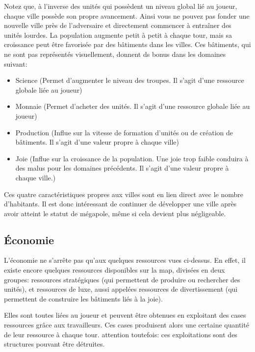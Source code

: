 \documentclass[12pt]{report}
\begin{document}
Notez que, à l’inverse des unités qui possèdent un niveau global lié au joueur,
chaque ville possède son propre avancement. Ainsi vous ne pouvez pas fonder une
nouvelle ville près de l’adversaire et directement commencer à entraîner des
unités lourdes. La population augmente petit à petit à chaque tour, mais sa
croissance peut être favorisée par des bâtiments dans les villes. Ces bâtiments,
qui ne sont pas représentés visuellement, donnent ds bonus dans les domaines
suivant:

\begin{itemize}
    \item Science (Permet d’augmenter le niveau des troupes. Il s’agit d’une
        ressource globale liée au joueur)
    \item Monnaie (Permet d’acheter des unités. Il s’agit d’une ressource
        globale liée au joueur)
    \item Production (Influe sur la vitesse de formation d’unités ou de création
        de bâtiments. Il s’agit d’une valeur propre à chaque ville)
    \item Joie (Influe sur la croissance de la population. Une joie trop faible
        conduira à des malus pour les domaines précédents. Il s’agit d’une
        valeur propre à chaque ville.)
\end{itemize}

Ces quatre caractéristiques propres aux villes sont en lien direct avec le
nombre d’habitants. Il est donc intéressant de continuer de développer une ville
après avoir atteint le statut de mégapole, même si cela devient plus
négligeable.

\subsection{Économie}

L’économie ne s’arrête pas qu’aux quelques ressources vues ci-dessus. En effet,
il existe encore quelques ressources disponibles sur la map, divisées en deux
groupes: ressources stratégiques (qui permettent de produire ou rechercher des
unités), et ressources de luxe, aussi appelées ressources de divertissement (qui
permettent de construire les bâtiments liés à la joie).

Elles sont toutes liées au joueur et peuvent être obtenues en exploitant des
cases ressources grâce aux travailleurs. Ces cases produisent alors une certaine
quantité de leur ressource à chaque tour. attention toutefois: ces exploitations
sont des structures pouvant être détruites.
\end{document}
